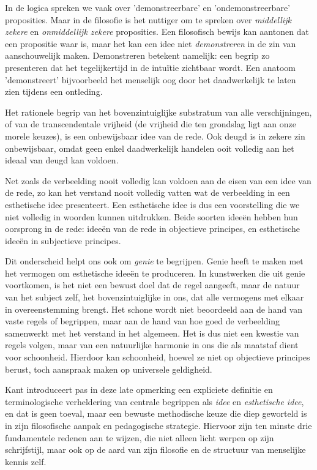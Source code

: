 \begin{mdframed}[leftmargin=0pt,rightmargin=0pt,backgroundcolor=blue!6,linecolor=white,innertopmargin=6pt,innerbottommargin=6pt]
In de logica spreken we vaak over 'demonstreerbare' en 'ondemonstreerbare' proposities. Maar in de filosofie is het nuttiger om te spreken over \textit{middellijk zekere} en \textit{onmiddellijk zekere} proposities. Een filosofisch bewijs kan aantonen dat een propositie waar is, maar het kan een idee niet \textit{demonstreren} in de zin van aanschouwelijk maken. Demonstreren betekent namelijk: een begrip zo presenteren dat het tegelijkertijd in de intuïtie zichtbaar wordt. Een anatoom 'demonstreert' bijvoorbeeld het menselijk oog door het daadwerkelijk te laten zien tijdens een ontleding.

Het rationele begrip van het bovenzintuiglijke substratum van alle verschijningen, of van de transcendentale vrijheid (de vrijheid die ten grondslag ligt aan onze morele keuzes), is een onbewijsbaar idee van de rede. Ook deugd is in zekere zin onbewijsbaar, omdat geen enkel daadwerkelijk handelen ooit volledig aan het ideaal van deugd kan voldoen.

Net zoals de verbeelding nooit volledig kan voldoen aan de eisen van een idee van de rede, zo kan het verstand nooit volledig vatten wat de verbeelding in een esthetische idee presenteert. Een esthetische idee is dus een voorstelling die we niet volledig in woorden kunnen uitdrukken. Beide soorten ideeën hebben hun oorsprong in de rede: ideeën van de rede in objectieve principes, en esthetische ideeën in subjectieve principes.

Dit onderscheid helpt ons ook om \textit{genie} te begrijpen. Genie heeft te maken met het vermogen om esthetische ideeën te produceren. In kunstwerken die uit genie voortkomen, is het niet een bewust doel dat de regel aangeeft, maar de natuur van het subject zelf, het bovenzintuiglijke in ons, dat alle vermogens met elkaar in overeenstemming brengt. Het schone wordt niet beoordeeld aan de hand van vaste regels of begrippen, maar aan de hand van hoe goed de verbeelding samenwerkt met het verstand in het algemeen. Het is dus niet een kwestie van regels volgen, maar van een natuurlijke harmonie in ons die als maatstaf dient voor schoonheid. Hierdoor kan schoonheid, hoewel ze niet op objectieve principes berust, toch aanspraak maken op universele geldigheid.

\bigskip
Kant introduceert pas in deze late opmerking een expliciete definitie en terminologische verheldering van centrale begrippen als \textit{idee} en \textit{esthetische idee}, en dat is geen toeval, maar een bewuste methodische keuze die diep geworteld is in zijn filosofische aanpak en pedagogische strategie. Hiervoor zijn ten minste drie fundamentele redenen aan te wijzen, die niet alleen licht werpen op zijn schrijfstijl, maar ook op de aard van zijn filosofie en de structuur van menselijke kennis zelf.


\end{mdframed}
